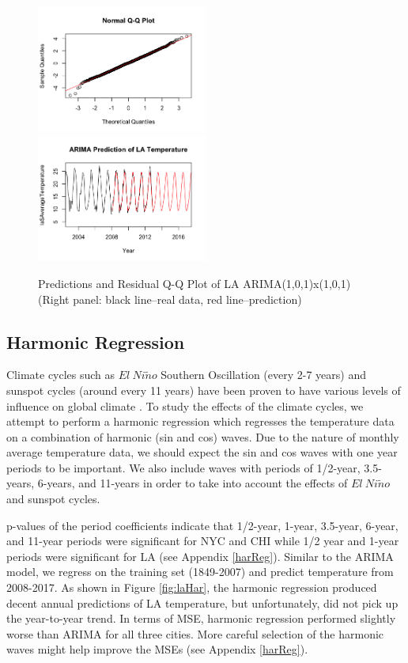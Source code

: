 \documentclass[12pt]{article}
\begin{document}
\begin{figure}[H]
    \includegraphics[width=0.5\textwidth]{Figures/laRes.png}
    \includegraphics[width=0.5\textwidth]{Figures/laPred.png}
    \caption{Predictions and Residual Q-Q Plot of LA ARIMA(1,0,1)x(1,0,1) (Right panel: black line--real data, red line--prediction)}
    \label{fig:laArima}
\end{figure}


\subsection{Harmonic Regression}
Climate cycles such as $El\ Ni\tilde{n}o$ Southern Oscillation (every 2-7 years) and sunspot cycles (around every 11 years) have been proven to have various levels of influence on global climate \cite{elnino}. To study the effects of the climate cycles, we attempt to perform a harmonic regression which regresses the temperature data on a combination of harmonic (sin and cos) waves. Due to the nature of monthly average temperature data, we should expect the sin and cos waves with one year periods to be important. We also include waves with periods of 1/2-year, 3.5-years, 6-years, and 11-years in order to take into account the effects of $El\ Ni\tilde{n}o$ and sunspot cycles. 

\vspace{0.5cm}
\noindent p-values of the period coefficients indicate that 1/2-year, 1-year, 3.5-year, 6-year, and 11-year periods were significant for NYC and CHI while 1/2 year and 1-year periods were significant for LA (see Appendix \ref{harReg}). Similar to the ARIMA model, we regress on the training set (1849-2007) and predict temperature from 2008-2017. As shown in Figure \ref{fig:laHar}, the harmonic regression produced decent annual predictions of LA temperature, but unfortunately, did not pick up the year-to-year trend. In terms of MSE, harmonic regression performed slightly worse than ARIMA for all three cities. More careful selection of the harmonic waves might help improve the MSEs (see Appendix \ref{harReg}).
\end{document}
